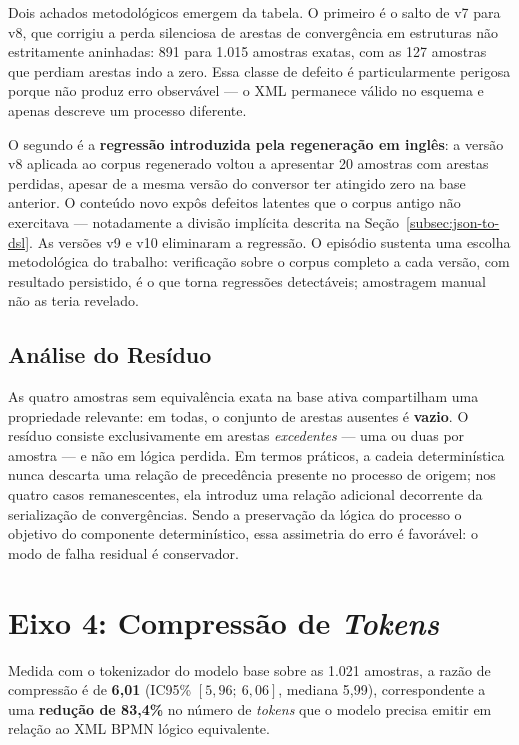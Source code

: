 Dois achados metodológicos emergem da tabela. O primeiro é o salto de v7 para v8, que corrigiu a perda silenciosa de arestas de convergência em estruturas não estritamente aninhadas: 891 para 1.015 amostras exatas, com as 127 amostras que perdiam arestas indo a zero. Essa classe de defeito é particularmente perigosa porque não produz erro observável — o XML permanece válido no esquema e apenas descreve um processo diferente.

O segundo é a \textbf{regressão introduzida pela regeneração em inglês}: a versão v8 aplicada ao corpus regenerado voltou a apresentar 20 amostras com arestas perdidas, apesar de a mesma versão do conversor ter atingido zero na base anterior. O conteúdo novo expôs defeitos latentes que o corpus antigo não exercitava — notadamente a divisão implícita descrita na Seção~\ref{subsec:json-to-dsl}. As versões v9 e v10 eliminaram a regressão. O episódio sustenta uma escolha metodológica do trabalho: verificação sobre o corpus completo a cada versão, com resultado persistido, é o que torna regressões detectáveis; amostragem manual não as teria revelado.

\subsection{Análise do Resíduo}
\label{subsec:res-residuo}

As quatro amostras sem equivalência exata na base ativa compartilham uma propriedade relevante: em todas, o conjunto de arestas ausentes é \textbf{vazio}. O resíduo consiste exclusivamente em arestas \textit{excedentes} — uma ou duas por amostra — e não em lógica perdida. Em termos práticos, a cadeia determinística nunca descarta uma relação de precedência presente no processo de origem; nos quatro casos remanescentes, ela introduz uma relação adicional decorrente da serialização de convergências. Sendo a preservação da lógica do processo o objetivo do componente determinístico, essa assimetria do erro é favorável: o modo de falha residual é conservador.

\section{Eixo 4: Compressão de \textit{Tokens}}
\label{sec:res-tcr}

Medida com o tokenizador do modelo base sobre as 1.021 amostras, a razão de compressão é de \textbf{6,01} (IC95\% $[5{,}96;\ 6{,}06]$, mediana 5,99), correspondente a uma \textbf{redução de 83,4\%} no número de \textit{tokens} que o modelo precisa emitir em relação ao XML BPMN lógico equivalente.

